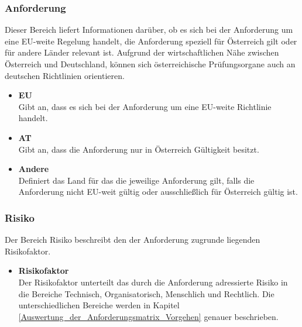 \subsubsection{Anforderung}
Dieser Bereich liefert Informationen darüber, ob es sich bei der Anforderung um eine EU-weite Regelung handelt, die Anforderung speziell für Österreich gilt oder für andere Länder relevant ist. Aufgrund der wirtschaftlichen Nähe zwischen Österreich und Deutschland, können sich österreichische Prüfungsorgane auch an deutschen Richtlinien orientieren.  
\begin{itemize}
    \item \textbf{EU}\\
    Gibt an, dass es sich bei der Anforderung um eine EU-weite Richtlinie handelt.
    \item \textbf{AT}\\
    Gibt an, dass die Anforderung nur in Österreich Gültigkeit besitzt. 
    \item \textbf{Andere}\\
    Definiert das Land für das die jeweilige Anforderung gilt, falls die Anforderung nicht EU-weit gültig oder ausschließlich für Österreich gültig ist.
\end{itemize}
\bigbreak
\subsubsection{Risiko}
Der Bereich \glqq{}Risiko\grqq{} beschreibt den der Anforderung zugrunde liegenden Risikofaktor. 
\begin{itemize}
    \item \textbf{Risikofaktor}\\
    Der \glqq{}Risikofaktor\grqq{} unterteilt das durch die Anforderung adressierte Risiko in die Bereiche \glqq{}Technisch\grqq{}, \glqq{}Organisatorisch\grqq{}, \glqq{}Menschlich\grqq{} und \glqq{}Rechtlich\grqq{}. Die unterschiedlichen Bereiche werden in Kapitel \ref{Auswertung_der_Anforderungsmatrix_Vorgehen} genauer beschrieben.
\end{itemize}
\bigbreak
